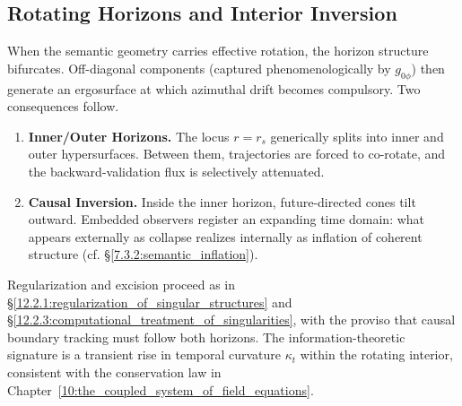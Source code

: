 
\subsection{Rotating Horizons and Interior Inversion}
\label{12.2.4:rotating_horizons_and_interior_inversion}

When the semantic geometry carries effective rotation, the horizon structure bifurcates. Off-diagonal components (captured phenomenologically by \(g_{0\phi}\)) then generate an ergosurface at which azimuthal drift becomes compulsory. Two consequences follow.

\begin{enumerate}
    \item \textbf{Inner/Outer Horizons.} The locus \(r=r_s\) generically splits into inner and outer hypersurfaces. Between them, trajectories are forced to co-rotate, and the backward-validation flux is selectively attenuated.
    \item \textbf{Causal Inversion.} Inside the inner horizon, future-directed cones tilt outward. Embedded observers register an expanding time domain: what appears externally as collapse realizes internally as inflation of coherent structure (cf. \S\ref{7.3.2:semantic_inflation}).
\end{enumerate}

Regularization and excision proceed as in \S\ref{12.2.1:regularization_of_singular_structures} and \S\ref{12.2.3:computational_treatment_of_singularities}, with the proviso that causal boundary tracking must follow both horizons. The information-theoretic signature is a transient rise in temporal curvature \(\kappa_t\) within the rotating interior, consistent with the conservation law in Chapter~\ref{10:the_coupled_system_of_field_equations}.